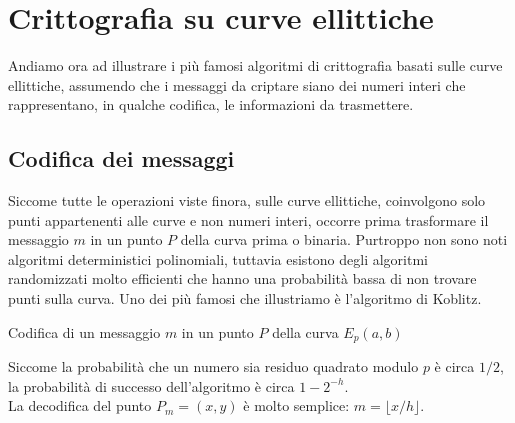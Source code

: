 \documentclass{article}
\begin{document}
	
	\clearpage
	
	\section{Crittografia su curve ellittiche}
	
	Andiamo ora ad illustrare i più famosi algoritmi di crittografia basati
	sulle curve ellittiche, assumendo che i messaggi da criptare siano dei numeri interi
	che rappresentano, in qualche codifica, le informazioni da trasmettere.
	
	
	\subsection{Codifica dei messaggi}
	
	Siccome tutte le operazioni viste finora, sulle curve ellittiche, coinvolgono solo punti
	appartenenti alle curve e non numeri interi, occorre prima trasformare il messaggio $m$ 
	in un punto $P$ della curva prima o binaria. Purtroppo non sono noti algoritmi deterministici polinomiali, tuttavia esistono degli algoritmi randomizzati molto efficienti che hanno una probabilità bassa di non trovare punti sulla curva. Uno dei più famosi che illustriamo è l'algoritmo di Koblitz.
	
	\begin{algorithm}[H]
		\caption{Codifica di un messaggio $m$ in un punto $P$ della curva $E_{p}(a,b)$}
		\begin{algorithmic}[1]
			\Statex
			\State
			\EndIf
			\EndWhile
			\State {}
			\EndFunction
		\end{algorithmic}
	\end{algorithm}
	
	Siccome la probabilità che un numero sia residuo quadrato modulo $p$ è circa $1/2$,
	la probabilità di successo dell'algoritmo è circa $1-2^{-h}$.\\
	La decodifica del punto $P_{m} = (x,y)$ è molto semplice: $m = \lfloor x/h \rfloor $.\\
	
\end{document}
